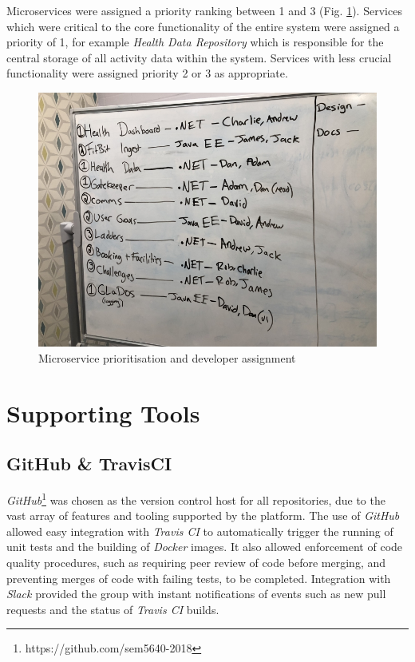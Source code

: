 Microservices were assigned a priority ranking between 1 and 3 (Fig. \ref{fig:numbering_microservice_priority}). Services which were critical to the core functionality of the entire system were assigned a priority of 1, for example \textit{Health Data Repository} which is responsible for the central storage of all activity data within the system. Services with less crucial functionality were assigned priority 2 or 3 as appropriate.

\begin{figure}[H]
    \centering
    \includegraphics[width=\textwidth]{Images/Numbering_Microservices.jpg}
    \caption{Microservice prioritisation and developer assignment}
    \label{fig:numbering_microservice_priority}
\end{figure}


\section{Supporting Tools}
\subsection{GitHub \& TravisCI}
\textit{GitHub}\footnote{https://github.com/sem5640-2018} was chosen as the version control host for all repositories, due to the vast array of features and tooling supported by the platform. The use of \textit{GitHub} allowed easy integration with \textit{Travis CI} to automatically trigger the running of unit tests and the building of \textit{Docker} images. It also allowed enforcement of code quality procedures, such as requiring peer review of code before merging, and preventing merges of code with failing tests, to be completed. Integration with \textit{Slack} provided the group with instant notifications of events such as new pull requests and the status of \textit{Travis CI} builds.

